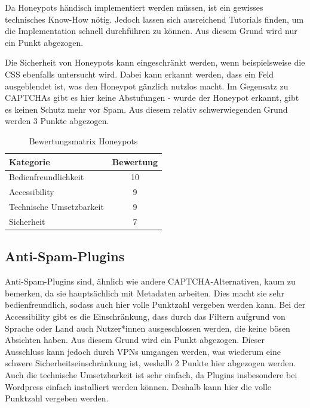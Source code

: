 Da Honeypots händisch implementiert werden müssen, ist ein gewisses technisches Know-How nötig.
Jedoch lassen sich ausreichend Tutorials finden, um die Implementation schnell durchführen zu können.
Aus diesem Grund wird nur ein Punkt abgezogen.

Die Sicherheit von Honeypots kann eingeschränkt werden, wenn beispielsweise die CSS ebenfalls untersucht wird. 
Dabei kann erkannt werden, dass ein Feld ausgeblendet ist, was den Honeypot gänzlich nutzlos macht.
Im Gegensatz zu CAPTCHAs gibt es hier keine Abstufungen - wurde der Honeypot erkannt, gibt es keinen Schutz mehr vor Spam.
Aus diesem relativ schwerwiegenden Grund werden 3 Punkte abgezogen.

\begin{table}[h!]
    \caption{Bewertungsmatrix Honeypots}
    \begin{center}
        \begin{tabular}{l|c}
            Kategorie                       & Bewertung \\\hline
            Bedienfreundlichkeit            & 10         \\
            Accessibility                   & 9        \\
            Technische Umsetzbarkeit        & 9         \\
            Sicherheit                      & 7         
        \end{tabular}
    \end{center}
\end{table}

\subsection{Anti-Spam-Plugins}
Anti-Spam-Plugins sind, ähnlich wie andere CAPTCHA-Alternativen, kaum zu bemerken, da sie hauptsächlich mit Metadaten arbeiten.
Dies macht sie sehr bedienfreundlich, sodass auch hier volle Punktzahl vergeben werden kann.
Bei der Accessibility gibt es die Einschränkung, dass durch das Filtern aufgrund von Sprache oder Land auch Nutzer*innen ausgeschlossen werden,
die keine bösen Absichten haben. Aus diesem Grund wird ein Punkt abgezogen.
Dieser Ausschluss kann jedoch durch VPNs umgangen werden,
was wiederum eine schwere Sicherheitseinschränkung ist, weshalb 2 Punkte hier abgezogen werden.
Auch die technische Umsetzbarkeit ist sehr einfach, da Plugins insbesondere bei Wordpress einfach installiert werden können.
Deshalb kann hier die volle Punktzahl vergeben werden.

